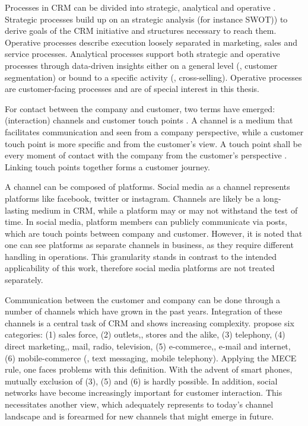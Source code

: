 		
		Processes in CRM can be divided into strategic, analytical and operative \citep{Neckel2005}. Strategic processes build up on an strategic analysis (for instance \acrshort{SWOT})) to derive goals of the CRM initiative and structures necessary to reach them. Operative processes describe execution loosely separated in marketing, sales and service processes. Analytical processes support both strategic and operative processes through data-driven insights either on a general level (\ie, customer segmentation) or bound to a specific activity (\ie, cross-selling). Operative processes are customer-facing processes and are of special interest in this thesis. 
		
		 For contact between the company and customer, two terms have emerged: (interaction) channels and customer touch points \citep{Leuer2011}. A channel is a medium that facilitates communication and seen from a company perspective, while a customer touch point is more specific and from the customer's view. A touch point shall be every moment of contact with the company from the customer's perspective \citep{Zomerdijk_2010}. Linking touch points together forms a customer journey. 
		 
		 A channel can be composed of platforms. Social media as a channel represents platforms like facebook, twitter or instagram. Channels are likely be a long-lasting medium in CRM, while a platform may or may not withstand the test of time. In social media, platform members can publicly communicate via posts, which are touch points between company and customer. 
		 However, it is noted that one can see platforms as separate channels in business, as they require different handling in operations. This granularity stands in contrast to the intended applicability of this work, therefore social media platforms are not treated separately. 
		
		Communication between the customer and company can be done through a number of channels which have grown in the past years. Integration of these channels is a central task of CRM and shows increasing complexity. \cite{paynefrow2005} propose six categories: (1) sales force, (2) outlets,\ie, stores and the alike, (3) telephony, (4) direct marketing,\ie , mail, radio, television, (5) e-commerce,\ie , e-mail and internet, (6) mobile-commerce (\ie, text messaging, mobile telephony). Applying the \acrfull{MECE} rule, one faces problems with this definition. With the advent of smart phones, mutually exclusion of (3), (5) and (6) is hardly possible. In addition, social networks have become increasingly important for customer interaction. This necessitates another view, which adequately represents to today's channel landscape and is forearmed for new channels that might emerge in future. 
		
